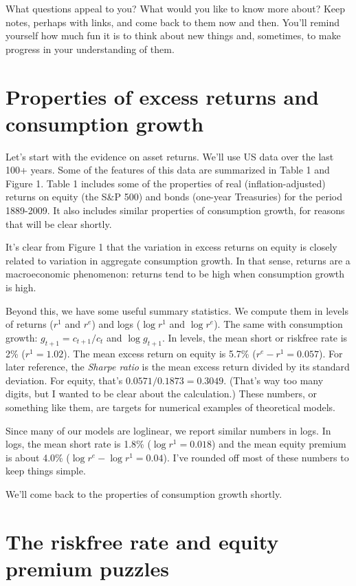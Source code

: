 \documentclass[11pt]{article}
\begin{document}
%
What questions appeal to you?
What would you like to know more about?
Keep notes, perhaps with links,
and come back to them now and then.
You'll remind yourself how much fun it is to think about new things
and, sometimes, to make progress in your understanding of them.


\section{Properties of excess returns and consumption growth}

Let's start with the evidence on asset returns.
We'll use US data over the last 100+ years.
Some of the features of this data are summarized in Table 1 and Figure 1.
Table 1 includes some of the properties of
real (inflation-adjusted) returns on equity (the S\&P 500)
and bonds (one-year Treasuries) for the period 1889-2009.
It also includes similar properties of consumption growth,
for reasons that will be clear shortly.

It's clear from Figure 1 that the variation in excess returns on equity
is closely related to variation in aggregate consumption growth.
In that sense, returns are a macroeconomic phenomenon:
returns tend to be high when consumption growth is high.

Beyond this, we have some useful summary statistics.
We compute them in levels of returns ($r^1$ and $r^e$)
and logs ($\log r^1$ and $\log r^e$).
The same with consumption growth:  $g_{t+1} = c_{t+1}/c_t$
and $\log g_{t+1}$.
In levels, the mean short or riskfree rate is 2\% ($r^1 = 1.02$).
The mean excess return on equity is 5.7\% ($r^e - r^1 = 0.057$).
For later reference, the {\it Sharpe ratio\/}
is the mean excess return divided by its standard deviation.
For equity, that's $ 0.0571/0.1873 = 0.3049$.
(That's way too many digits, but I wanted to be clear about the calculation.)
These numbers, or something like them, are targets for numerical examples
of theoretical models.

Since many of our models are loglinear, we report similar numbers in logs.
In logs, the mean short rate is 1.8\% ($\log r^1 = 0.018$)
and the mean equity premium is about 4.0\% ($\log r^e - \log r^1 = 0.04$).
I've rounded off most of these numbers to keep things simple.

We'll come back to the properties of consumption growth shortly.


\section{The riskfree rate and equity premium puzzles}
\label{sec:equity-premium}
\end{document}
